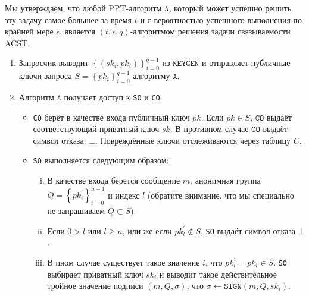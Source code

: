 \documentclass{llncs}
\newcommand{\A}{\texttt{A}}
\begin{document}
\begin{definition}\label{def:acst-link-adv}
Мы утверждаем, что любой PPT-алгоритм $\A$, который может успешно решить эту задачу самое большее за время $t$ и с вероятностью успешного выполнения по крайней мере $\epsilon$, является $(t, \epsilon, q)$-алгоритмом решения задачи связываемости ACST.

\begin{enumerate}
\item Запросчик выводит $\left\{(sk_i, pk_i)\right\}_{i=0}^{q-1}$ из $\texttt{KEYGEN}$ и отправляет публичные ключи запроса $S = \left\{pk_i\right\}_{i=0}^{q-1}$ алгоритму $\A$.

\item Алгоритм $\A$ получает доступ к \texttt{SO} и \texttt{CO}.
    \begin{itemize}
    \item \texttt{CO} берёт в качестве входа публичный ключ $pk$. Если $pk \in S$, $\texttt{CO}$ выдаёт соответствующий приватный ключ $sk$. В противном случае $\texttt{CO}$ выдаёт символ отказа, $\bot$. Повреждённые ключи отслеживаются через таблицу $C$.

    \item \texttt{SO} выполняется следующим образом:
        \begin{enumerate}[(i)]
        \item В качестве входа берётся сообщение $m$, анонимная группа $Q = \left\{pk^\prime_i\right\}_{i=0}^{n-1}$ и индекс $l$ (обратите внимание, что мы специально не запрашиваем $Q \subset S$).

        \item Если $0 > l$ или $l \geq n$, или же если $pk^\prime_l \notin S$, \texttt{SO} выдаёт символ отказа $\bot$.

        \item В ином случае существует такое значение $i$, что \linebreak $pk^\prime_l = pk_i \in S$. \texttt{SO} выбирает приватный ключ $sk_i$ и выводит такое действительное тройное значение подписи $(m, Q, \sigma)$, что $\sigma \leftarrow \texttt{SIGN}(m, Q, sk_i)$.
        \end{enumerate}
    \end{itemize}


\end{enumerate}
\end{definition}
\end{document}
